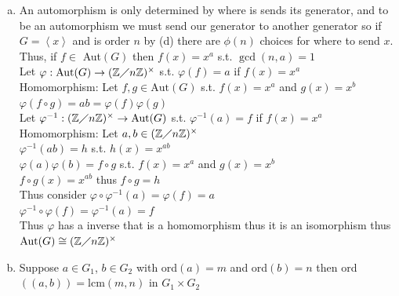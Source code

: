 \documentclass[12pt,letterpaper]{article}
\theoremstyle{definition}
\newcommand{\Z}{\mathbb{Z}}
\renewcommand{\t}[1]{\text{#1}}
\newcommand{\ang}[1]{\left\langle #1 \right\rangle}
\begin{document}
\begin{enumerate}[(a)]
    Let $x \in G$ have order $d$ since $H$ is unique we know $\ang{h}=\ang{x} \implies x=h^m$ and by proof in (a) we know $\gcd(m,d)=1$\\
    Thus the number of choices of $m$ is $\phi(d)$\\
    Since every element has one unique order consider taking the sum of all the elements based on there order for example\\
    \begin{align*}
        \sum\limits_{i=1}^n|\{a \in G \mid a \t{ is order $i$}\}|=n
        \intertext{By lagrange's theorem we know the only possible orders are divisors of $n$ thus}
        \sum\limits_{d \mid n}|\{a \in G \mid a \t{ is order $d$}\}|=n
        \intertext{And by the proof above we know $|\{a \in G \mid a \t{ is order $d$}\}|=\phi(d)$ thus}
        \sum\limits_{d \mid n}\phi(d)=n
    \end{align*} 
    \item An automorphism is only determined by where is sends its generator, and to be an automorphism we must send our generator to another generator so if $G=\ang{x}$ and is order $n$ by (d) there are $\phi(n)$ choices for where to send $x$.
    Thus, if $f \in$ Aut$(G)$ then $f(x)=x^a$ s.t. $\gcd(n,a)=1$\\
    Let $\varphi: \t{Aut}(G) \rightarrow (\Z\diagup n\Z)^\times$ s.t. $\varphi(f)=a$ if $f(x)=x^a$\\
    Homomorphism: Let $f,g \in \t{Aut}(G)$ s.t. $f(x)=x^a$ and $g(x)=x^b$\\
    $\varphi(f \circ g)=ab=\varphi(f)\varphi(g)$\\
    Let $\varphi^{-1}: (\Z\diagup n\Z)^\times \rightarrow \t{Aut}(G) $ s.t. $\varphi^{-1}(a)=f$ if $f(x)=x^a$\\
    Homomorphism: Let $a,b \in (\Z\diagup n\Z)^\times$\\
    $\varphi^{-1}(ab)=h$ s.t. $h(x)=x^{ab}$\\
    $\varphi(a)\varphi(b)=f \circ g$ s.t. $f(x)=x^a$ and $g(x)=x^b$\\
    $f\circ g(x)=x^{ab}$ thus $f\circ g = h$\\
    Thus consider $\varphi \circ \varphi^{-1}(a)=\varphi(f)=a$\\
    $\varphi^{-1} \circ \varphi(f)=\varphi^{-1}(a)=f$\\
    Thus $\varphi$ has a inverse that is a homomorphism thus it is an isomorphism thus $\t{Aut}(G) \cong (\Z\diagup n\Z)^\times$
    \item Suppose $a\in G_1$, $b\in G_2$ with ord$(a)=m$ and
    ord$(b)=n$ then ord$((a,b))=$lcm$(m,n)$ in $G_1\times G_2$
    

\end{enumerate}
\end{document}
